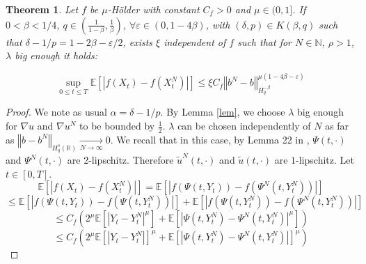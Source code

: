\documentclass[11pt]{article}
\newtheorem{theo}{Theorem}
\newcommand{\norme}[1]{\left\Vert #1\right\Vert}
\newcommand{\R}{\mathbb{R}}
\newcommand{\N}{\mathbb{N}}
\newcommand{\E}{\mathbb{E}}
\begin{document}
\begin{theo}
    Let $f$ be $\mu$-Hölder with constant $C_f>0$ and $\mu\in(0,1]$. If $0<\beta < 1/4$, $q\in\left(\frac{1}{1-\beta},\frac{1}{\beta}\right)$, $\forall \varepsilon \in(0,1-4\beta)$, with  $(\delta,p)\in K(\beta,q)$ such that $\delta - 1/p = 1-2\beta - \varepsilon/2$, exists $\xi$ independent of $f$ such that for $N\in\N$, $\rho>1$, $\lambda$ big enough it holds:
    
    \begin{equation*}
    \underset{0\leq t\leq T} {\sup}\E\left[\left|f\left(X_t\right)-f\left(X_t^N\right)\right|\right] \leq \xi C_f \norme{b^N-b}_{H^{-\beta}_{q}}^{\mu\left(1-4\beta-\varepsilon\right)}
    \end{equation*}
\end{theo}

\begin{proof}
    We note as usual $\alpha = \delta - 1/p$.
    By Lemma \ref{lem}, we choose $\lambda$ big enough for $\nabla u$ and $\nabla u^N$ to be bounded by $\frac{1}{2}$. $\lambda$ can be chosen independently of $N$ as far as $\norme{b - b^N}_{H_q^s(\R)} \underset{N\rightarrow\infty}{\longrightarrow} 0$. We recall that in this case, by Lemma 22 in \cite{Fla-Iss-Rus-2017}, $\Psi(t,\cdot)$ and $\Psi^N(t,\cdot)$ are 2-lipschitz. Therefore $\widetilde{u}^N(t,\cdot)$ and $\widetilde{u}(t,\cdot)$ are $1$-lipschitz.  Let $t\in[0,T]$.      
    \begin{equation*}
    \E\left[\left|f\left(X_t\right)-f\left(X_t^N\right)\right|\right] = \E\left[\left|f\left(\Psi\left(t,Y_t\right)\right)-f\left(\Psi^N\left(t,Y_t^N\right)\right)\right|\right]
    \end{equation*}   
    \begin{equation*}
    \leq  \E\left[\left|f\left(\Psi\left(t,Y_t\right)\right)-f\left(\Psi\left(t,Y_t^N\right)\right)\right|\right]+\E\left[\left|f\left(\Psi\left(t,Y_t^N\right)\right)-f\left(\Psi^N\left(t,Y_t^N\right)\right)\right|\right]
    \end{equation*}  
    \begin{equation*}
    \leq C_f  \left(2^\mu\E\left[\left|Y_t-Y_t^N\right|^\mu\right]+\E\left[\left|\Psi\left(t,Y_t^N\right)-\Psi^N\left(t,Y_t^N\right)\right|^\mu\right]\right)
    \end{equation*}
    \begin{equation}\label{jensen}
    \leq C_f  \left(2^\mu\E\left[\left|Y_t-Y_t^N\right|\right]^\mu+\E\left[\left|\Psi\left(t,Y_t^N\right)-\Psi^N\left(t,Y_t^N\right)\right|\right]^\mu\right)

\end{equation}
\end{proof}
\end{document}

